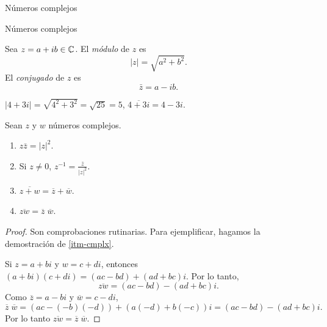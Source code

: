 \begin{chapter}{N\'umeros complejos}
\begin{section}{N\'umeros complejos}
    \begin{definicion} Sea $z = a + ib \in \mathbb C$. El \textit{módulo} de $z$ es
        \begin{equation*}
            |z| = \sqrt{a^2+b^2}.
        \end{equation*}
        El  \textit{conjugado} de $z$ es
        \begin{equation*}
            \bar z = a-ib.
        \end{equation*}
    \end{definicion}

    \begin{ejemplo*}
        $|4+3i| = \sqrt{4^2+3^2} = \sqrt{25} =5$, $\overline{4+3i} = 4-3i$.
    \end{ejemplo*}

    \begin{proposicion} Sean $z$ y $w$ números complejos.
        \begin{enumerate}
            \item $z\bar{z} = |z|^2$.
            \item Si $z \ne 0$, $z^{-1} = \displaystyle\frac{\overline{z}}{|z|^2}$.
            \item  $\overline{z+w} = \overline{z} + \overline{w}$.
            \item\label{itm-cmplx}  $\overline{zw} = \overline{z}\;  \overline{w}$.
        \end{enumerate}
    \end{proposicion}
    \begin{proof}
        Son comprobaciones rutinarias. Para ejemplificar, hagamos la demostración  de \ref{itm-cmplx}.

        Si $z = a + bi$ y $w = c +di$, entonces $(a+bi) (c+di) = (ac -bd) + (ad+bc)i$. Por lo tanto,
        \begin{equation*}
            \overline{zw} = (ac -bd) - (ad+bc)i.
        \end{equation*}
        Como $\overline{z} = a - bi$ y $\overline{w} = c -di$,
        \begin{equation*}
            \overline{z}\;  \overline{w} = (ac -(-b)(-d)) + (a(-d)+b(-c) )i = (ac -bd) - (ad+bc)i.
        \end{equation*}
        Por lo tanto $	\overline{zw} = \overline{z}\;  \overline{w}$.
    \end{proof}


\end{section}
\end{chapter}
